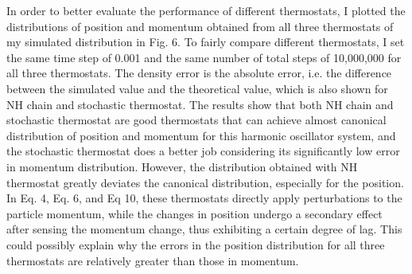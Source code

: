 \documentclass{article}
\begin{document}
In order to better evaluate the performance of different thermostats, I plotted the distributions of position and momentum obtained from all three thermostats of my simulated distribution in Fig. 6. To fairly compare different thermostats, I set the same time step of 0.001 and the same number of total steps of 10,000,000 for all three thermostats. The density error is the absolute error, i.e. the difference between the simulated value and the theoretical value, which is also shown for NH chain and stochastic thermostat. The results show that both NH chain and stochastic thermostat are good thermostats that can achieve almost canonical distribution of position and momentum for this harmonic oscillator system, and the stochastic thermostat does a better job considering its significantly low error in momentum distribution. However, the distribution obtained with NH thermostat greatly deviates the canonical distribution, especially for the position. In Eq. 4, Eq. 6, and Eq 10, these thermostats directly apply perturbations to the particle momentum, while the changes in position undergo a secondary effect after sensing the momentum change, thus exhibiting a certain degree of lag. This could possibly explain why the errors in the position distribution for all three thermostats are relatively greater than those in momentum.
\end{document}
